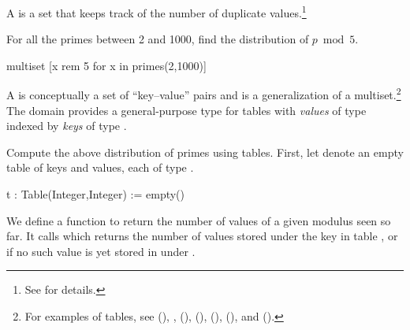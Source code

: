 {{{{{{{{A 
is a set that keeps track of the number
of duplicate values.\footnote{See  for details.}
\begin{xtc}
\begin{xtccomment}
For all the primes  between 2 and 1000, find the
distribution of $p \bmod 5$.
\end{xtccomment}
\begin{spadsrc}
multiset [x rem 5 for x in primes(2,1000)]
\end{spadsrc}
\begin{TeXOutput}
\begin{fricasmath}{18}
%
\end{fricasmath}
\end{TeXOutput}
\end{xtc}

A 
is conceptually a set of ``key--value'' pairs and
is a generalization of a multiset.\footnote{For examples of tables, see
 (),
,
 (),
 (),
 (),
 (),
and  ().}
The domain  provides a general-purpose
type for tables with {\it values} of type  indexed
by {\it keys} of type .

\begin{xtc}
\begin{xtccomment}
Compute the above distribution of primes using tables.
First, let  denote an empty table of keys and values,
each of type .
\end{xtccomment}
\begin{spadsrc}
t : Table(Integer,Integer) := empty()
\end{spadsrc}
\begin{TeXOutput}
\begin{fricasmath}{19}
\PAREN{}%
\end{fricasmath}
\end{TeXOutput}
\end{xtc}

We define a function  to return the number
of values of a given modulus  seen so far.
It calls  which returns the number of
values stored under the key  in table , or
 if no such value is yet stored in  under
.

}}}}}}}}
